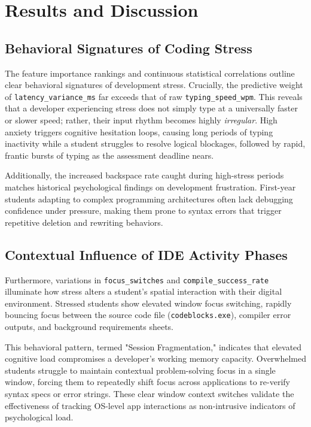 \section{Results and Discussion}

\subsection{Behavioral Signatures of Coding Stress}
The feature importance rankings and continuous statistical correlations outline clear behavioral signatures of development stress. Crucially, the predictive weight of \texttt{latency\_variance\_ms} far exceeds that of raw \texttt{typing\_speed\_wpm}. This reveals that a developer experiencing stress does not simply type at a universally faster or slower speed; rather, their input rhythm becomes highly \textit{irregular}. High anxiety triggers cognitive hesitation loops, causing long periods of typing inactivity while a student struggles to resolve logical blockages, followed by rapid, frantic bursts of typing as the assessment deadline nears.

\noindent Additionally, the increased backspace rate caught during high-stress periods matches historical psychological findings on development frustration. First-year students adapting to complex programming architectures often lack debugging confidence under pressure, making them prone to syntax errors that trigger repetitive deletion and rewriting behaviors.

\subsection{Contextual Influence of IDE Activity Phases}
Furthermore, variations in \texttt{focus\_switches} and \texttt{compile\_success\_rate} illuminate how stress alters a student's spatial interaction with their digital environment. Stressed students show elevated window focus switching, rapidly bouncing focus between the source code file (\texttt{codeblocks.exe}), compiler error outputs, and background requirements sheets.

\noindent This behavioral pattern, termed "Session Fragmentation," indicates that elevated cognitive load compromises a developer's working memory capacity. Overwhelmed students struggle to maintain contextual problem-solving focus in a single window, forcing them to repeatedly shift focus across applications to re-verify syntax specs or error strings. These clear window context switches validate the effectiveness of tracking OS-level app interactions as non-intrusive indicators of psychological load.


